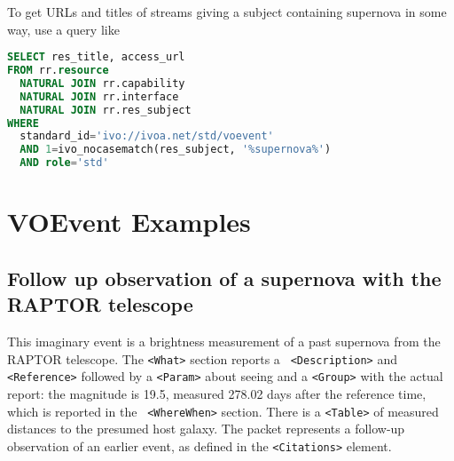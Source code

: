 \documentclass[11pt,a4paper]{ivoa}
\begin{document}
To get URLs and titles of streams giving a subject containing supernova
in some way, use a query like

\begin{lstlisting}[language=SQL]
SELECT res_title, access_url
FROM rr.resource
  NATURAL JOIN rr.capability
  NATURAL JOIN rr.interface
  NATURAL JOIN rr.res_subject
WHERE
  standard_id='ivo://ivoa.net/std/voevent'
  AND 1=ivo_nocasematch(res_subject, '%supernova%')
  AND role='std'
\end{lstlisting}

\section{VOEvent Examples}
\label{sec:4}
\subsection{Follow up observation of a supernova with the RAPTOR telescope}
This imaginary event is a brightness measurement of a past supernova from the 
RAPTOR \citep{bib10} telescope. The \texttt{<What>} section reports a \texttt{
<Description>} and \texttt{<Reference>} followed by a \texttt{<Param>} about seeing 
and a \texttt{<Group>} with the actual report: the magnitude is 19.5, measured 
278.02 days after the reference time, which is reported in the \texttt{
<WhereWhen>} section. There is a \texttt{<Table>} of measured distances to the 
presumed host galaxy. The packet represents a follow-up observation of an 
earlier event, as defined in the \texttt{<Citations>} element. 
\end{document}
